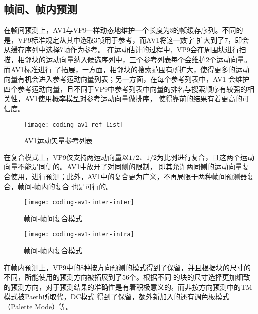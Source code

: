 \subsection{帧间、帧内预测}

在帧间预测上，AV1与VP9一样动态地维护一个长度为8的帧缓存序列。不同的是，VP9标准规定从其中选取3帧用于参考，而AV1将这一数字
扩大到了7，即会从缓存序列中选择7帧作为参考。
在运动估计的过程中，VP9会在周围块进行扫描，相邻块的运动向量纳入候选序列中，三个参考列表每个会维护2个运动向量。而AV1标准进行
了拓展，一方面，相邻块的搜索范围有所扩大，使得更多的运动向量有机会进入参考运动向量列表；另一方面，在每个参考列表中，AV1
会维护四个参考运动向量，且不同于VP9中参考列表中向量的排名与搜索顺序有较强的相关性，AV1使用概率模型对参考运动向量做排序，
使得靠前的结果有着更高的可信度。

\begin{figure}[H] %
  \centering
  \texttt{[image: coding-av1-ref-list]}
  \caption{AV1运动矢量参考列表}
  \label{fig:coding-av1-ref-list}
\end{figure}

在复合模式上，VP9仅支持两运动向量以$1/2$、$1/2$为比例进行复合，且这两个运动向量不能是同侧的。AV1中放开了对同侧的限制，
即其允许两同侧的运动向量复合使用，进行预测；此外，AV1中的复合更为广义，不再局限于两种帧间预测器复合，帧间-帧内的复合
也是可行的。

\begin{figure}[H] %
  \centering
  \texttt{[image: coding-av1-inter-inter]}
  \caption{帧间-帧间复合模式}
\end{figure}

\begin{figure}[H] %
  \centering
  \texttt{[image: coding-av1-inter-intra]}
  \caption{帧间-帧内复合模式}
\end{figure}

在帧内预测上，VP9中的8种按方向预测的模式得到了保留，并且根据块的尺寸的不同，所能使用的预测方向被拓展到了56个。根据不同
的块的尺寸选择更加细致的预测方向，对于预测结果的准确性是有着积极意义的。而非按方向预测中的TM模式被Paeth所取代，DC模式
得到了保留，额外新加入的还有调色板模式（Palette Mode）等。



